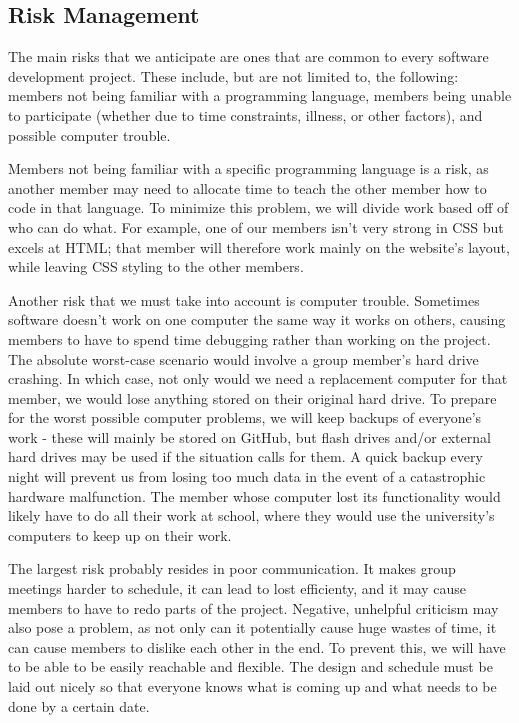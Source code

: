 \documentclass[12pt]{article}
\begin{document}
\subsection{Risk Management}
\begin{flushleft}
The main risks that we anticipate are ones that are common to every software development project. These include, but are not limited to, the following: members not being familiar with a programming language, members being unable to participate (whether due to time constraints, illness, or other factors), and possible computer trouble.
\end{flushleft}
\begin{flushleft}
Members not being familiar with a specific programming language is a risk, as another member may need to allocate time to teach the other member how to code in that language. To minimize this problem, we will divide work based off of who can do what. For example, one of our members isn't very strong in CSS but excels at HTML; that member will therefore work mainly on the website's layout, while leaving CSS styling to the other members.
\end{flushleft}
\begin{flushleft}
Another risk that we must take into account is computer trouble. Sometimes software doesn’t work on one computer the same way it works on others, causing members to have to spend time debugging rather than working on the project. The absolute worst-case scenario would involve a group member's hard drive crashing. In which case, not only would we need a replacement computer for that member, we would lose anything stored on their original hard drive. To prepare for the worst possible computer problems, we will keep backups of everyone's work - these will mainly be stored on GitHub, but flash drives and/or external hard drives may be used if the situation calls for them. A quick backup every night will prevent us from losing too much data in the event of a catastrophic hardware malfunction. The member whose computer lost its functionality would likely have to do all their work at school, where they would use the university’s computers to keep up on their work.
\end{flushleft}
\begin{flushleft}
The largest risk probably resides in poor communication. It makes group meetings harder to schedule, it can lead to lost efficienty, and it may cause members to have to redo parts of the project. Negative, unhelpful criticism may also pose a problem, as not only can it potentially cause huge wastes of time, it can cause members to dislike each other in the end. To prevent this, we will have to be able to be easily reachable and flexible. The design and schedule must be laid out nicely so that everyone knows what is coming up and what needs to be done by a certain date.
\end{flushleft}
\end{document}
